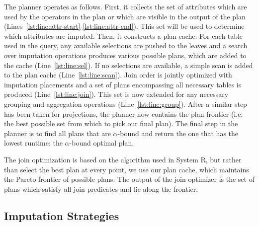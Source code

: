 The planner operates as follows.
First, it collects the set of attributes which are used by the operators in the plan or which are visible in the output of the plan (Lines~\ref{lst:line:attr-start}-\ref{lst:line:attr-end}).
This set will be used to determine which attributes are imputed.
Then, it constructs a plan cache. For each table used in the query, any available selections are pushed to the leaves and
a search over imputation operations produces various possible plans, which are added to the cache (Line~\ref{lst:line:sel}). If no selections are available, a 
simple scan is added to the plan cache (Line~\ref{lst:line:scan}). Join order is jointly optimized with imputation placements and a set of
plans encompassing all necessary tables is produced (Line~\ref{lst:line:join}). This set is now extended for any necessary grouping and aggregation
operations (Line~\ref{lst:line:group}). After a similar step has been taken for projections, the planner now contains the plan frontier (i.e. the
best possible set from which to pick our final plan). The final step in the planner is to find all plans that are
$\alpha$-bound and return the one that has the lowest runtime: the $\alpha$-bound optimal plan.

The join optimization is based on the algorithm used in System R\cite{blasgen1981system},
but rather than select the best plan at every point, we use our plan cache, which maintains the Pareto frontier of possible plans. The output of the join optimizer is the set of plans which satisfy all join predicates and lie along the frontier.

\begin{algorithm}

\end{algorithm}

\begin{algorithm}

\end{algorithm}

%

\begin{algorithm}

\end{algorithm}

\subsection{Imputation Strategies}
\label{sec:imputation}

